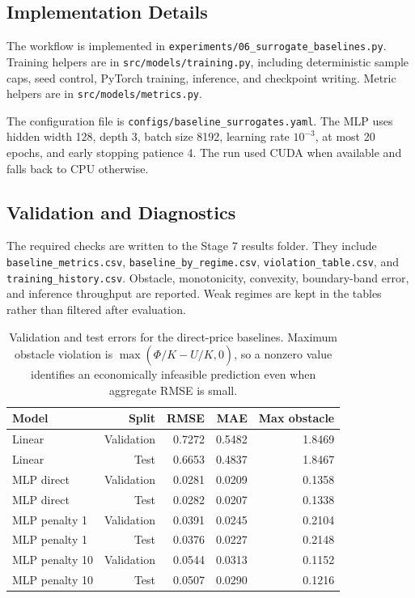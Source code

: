 \documentclass[11pt]{article}
\begin{document}
\subsection{Implementation Details}
The workflow is implemented in \texttt{experiments/06\_surrogate\_baselines.py}. Training helpers are in \texttt{src/models/training.py}, including deterministic sample caps, seed control, PyTorch training, inference, and checkpoint writing. Metric helpers are in \texttt{src/models/metrics.py}.

The configuration file is \texttt{configs/baseline\_surrogates.yaml}. The MLP uses hidden width 128, depth 3, batch size 8192, learning rate $10^{-3}$, at most 20 epochs, and early stopping patience 4. The run used CUDA when available and falls back to CPU otherwise.

\subsection{Validation and Diagnostics}
The required checks are written to the Stage 7 results folder. They include \texttt{baseline\_metrics.csv}, \texttt{baseline\_by\_regime.csv}, \texttt{violation\_table.csv}, and \texttt{training\_history.csv}.
Obstacle, monotonicity, convexity, boundary-band error, and inference throughput are reported. Weak regimes are kept in the tables rather than filtered after evaluation.

\begin{table}[h]
\centering
\begin{tabular}{lrrrr}
\toprule
Model & Split & RMSE & MAE & Max obstacle\\
\midrule
Linear & Validation & 0.7272 & 0.5482 & 1.8469\\
Linear & Test & 0.6653 & 0.4837 & 1.8467\\
MLP direct & Validation & 0.0281 & 0.0209 & 0.1358\\
MLP direct & Test & 0.0282 & 0.0207 & 0.1338\\
MLP penalty 1 & Validation & 0.0391 & 0.0245 & 0.2104\\
MLP penalty 1 & Test & 0.0376 & 0.0227 & 0.2148\\
MLP penalty 10 & Validation & 0.0544 & 0.0313 & 0.1152\\
MLP penalty 10 & Test & 0.0507 & 0.0290 & 0.1216\\
\bottomrule
\end{tabular}
\caption{Validation and test errors for the direct-price baselines. Maximum obstacle violation is \(\max(\Phi/K-\widehat U/K,0)\), so a nonzero value identifies an economically infeasible prediction even when aggregate RMSE is small.}
\end{table}
\end{document}
